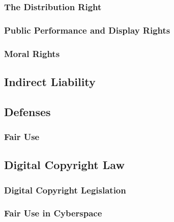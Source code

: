 
\subsubsection{The Distribution Right}


\subsubsection{Public Performance and Display Rights}


\subsubsection{Moral Rights}


\subsection{Indirect Liability}


\subsection{Defenses}


\subsubsection{Fair Use}



\subsection{Digital Copyright Law}

\subsubsection{Digital Copyright Legislation}


\subsubsection{Fair Use in Cyberspace}

